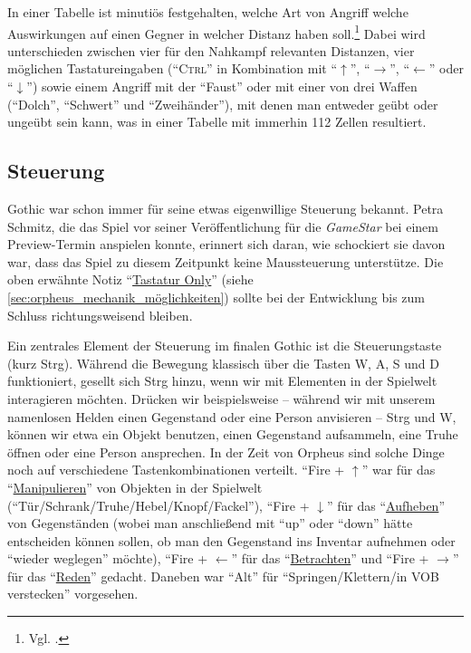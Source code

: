 \documentclass[a5paper,pagesize,numbers=noenddot]{scrbook}
\begin{document}
In einer Tabelle ist minutiös festgehalten, welche Art von Angriff welche Auswirkungen auf einen Gegner in welcher Distanz haben soll.\footnote{Vgl. \autocite[S.~4--5]{orpheus_kampfsteuerung}.}
Dabei wird unterschieden zwischen vier für den Nahkampf relevanten Distanzen, vier möglichen Tastatureingaben (\enquote{\textsc{Ctrl}} in Kombination mit \enquote{$\uparrow$}, \enquote{$\rightarrow$}, \enquote{$\leftarrow$} oder \enquote{$\downarrow$}) sowie einem Angriff mit der \enquote{Faust} oder mit einer von drei Waffen (\enquote{Dolch}, \enquote{Schwert} und \enquote{Zweihänder}), mit denen man entweder geübt oder ungeübt sein kann, was in einer Tabelle mit immerhin 112 Zellen resultiert.\autocite[S.~4]{orpheus_kampfsteuerung}


\subsection{Steuerung}\label{sec:orpheus_mechanik_steuerung}
Gothic war schon immer für seine etwas eigenwillige Steuerung bekannt.
Petra Schmitz, die das Spiel vor seiner Veröffentlichung für die \textit{GameStar} bei einem Preview-Termin anspielen konnte, erinnert sich daran, wie schockiert sie davon war, dass das Spiel zu diesem Zeitpunkt keine Maussteuerung unterstütze.\autocite{schmitz_maussteuerung_2021}
Die oben erwähnte Notiz \enquote{\uline{Tastatur Only}}\autocite[S.~1]{orpheus_interface} (siehe \autoref{sec:orpheus_mechanik_möglichkeiten}) sollte bei der Entwicklung bis zum Schluss richtungsweisend bleiben.

Ein zentrales Element der Steuerung im finalen Gothic ist die Steuerungstaste (kurz Strg).
Während die Bewegung klassisch über die Tasten W, A, S und D funktioniert, gesellt sich Strg hinzu, wenn wir mit Elementen in der Spielwelt interagieren möchten.
Drücken wir beispielsweise -- während wir mit unserem namenlosen Helden einen Gegenstand oder eine Person anvisieren -- Strg und W, können wir etwa ein Objekt benutzen, einen Gegenstand aufsammeln, eine Truhe öffnen oder eine Person ansprechen.
In der Zeit von Orpheus sind solche Dinge noch auf verschiedene Tastenkombinationen verteilt.
\enquote{Fire + $\uparrow$} war für das \enquote{\uline{Manipulieren}} von Objekten in der Spielwelt (\enquote{Tür/Schrank/Truhe/Hebel/Knopf/Fackel}), \enquote{Fire + $\downarrow$} für das \enquote{\uline{Aufheben}} von Gegenständen (wobei man anschließend mit \enquote{up} oder \enquote{down} hätte entscheiden können sollen, ob man den Gegenstand ins Inventar aufnehmen oder \enquote{wieder weglegen} möchte), \enquote{Fire + $\leftarrow$} für das \enquote{\uline{Betrachten}} und \enquote{Fire + $\rightarrow$} für das \enquote{\uline{Reden}} gedacht.\autocite[S.~2]{orpheus_interface}
Daneben war \enquote{Alt} für \enquote{Springen/Klettern/in VOB verstecken} vorgesehen.\autocite[S.~3]{orpheus_interface}
\end{document}
